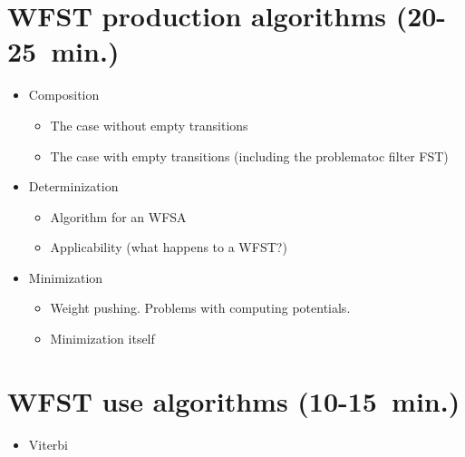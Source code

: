 \documentclass{article}
\begin{document}
\section{WFST production algorithms (20-25~min.)}

\begin{itemize}
  \item Composition
    \begin{itemize}
      \item The case without empty transitions
      \item The case with empty transitions (including the problematoc filter FST)
    \end{itemize}
  \item Determinization
    \begin{itemize}
      \item Algorithm for an WFSA
      \item Applicability (what happens to a WFST?)
    \end{itemize}
  \item Minimization
    \begin{itemize}
      \item Weight pushing. Problems with computing potentials.
      \item Minimization itself
    \end{itemize}
\end{itemize}

\section{WFST use algorithms (10-15~min.)}

\begin{itemize}
  \item Viterbi
\end{itemize}
\end{document}
